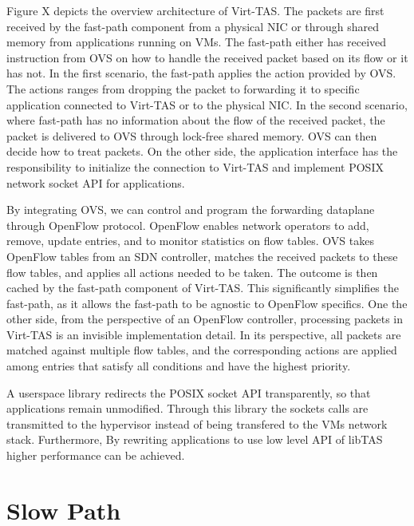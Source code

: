 Figure X depicts the overview architecture of Virt-TAS. The packets are first received 
by the fast-path component from a physical NIC or through shared memory from applications 
running on VMs. The fast-path either has received instruction from OVS on how to handle 
the received packet based on its flow or it has not. In the first scenario, the fast-path 
applies the action provided by OVS. The actions ranges from dropping the packet to forwarding 
it to specific application connected to Virt-TAS or to the physical NIC. In the second 
scenario, where fast-path has no information about the flow of the received packet,  the 
packet is delivered to OVS through lock-free shared memory. OVS can then decide how to treat 
packets. On the other side, the application interface has the responsibility to initialize the 
connection to Virt-TAS and implement POSIX network socket API for applications.

By integrating OVS, we can control and program the forwarding dataplane through 
OpenFlow protocol. OpenFlow enables network operators to add, remove, update entries,
and to monitor statistics on flow tables. OVS takes OpenFlow tables from an SDN
controller, matches the received packets to these flow tables, and applies 
all actions needed to be taken. The outcome is then cached by the fast-path component
of Virt-TAS. This significantly simplifies the fast-path, as it allows the fast-path to 
be agnostic to OpenFlow specifics. One the other side, from the perspective of an OpenFlow 
controller,  processing packets in Virt-TAS is an invisible implementation detail. In its 
perspective, all packets are matched against multiple flow tables, and the corresponding 
actions are applied among entries that satisfy all conditions and have the highest priority.



A userspace library redirects the POSIX socket API transparently, so that applications 
remain unmodified. Through this library the sockets calls are transmitted to the 
hypervisor instead of being transfered to the VMs network stack. Furthermore, 
By rewriting applications to use low level API of libTAS higher performance can be achieved.

\section{Slow Path}
